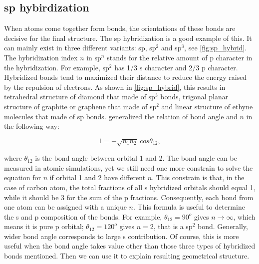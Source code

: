 \subsection{sp hybirdization}

When atoms come together form bonds, the orientations of these bonds are decisive for the final structure. The sp hybridization is a good example of this.  It can mainly exist in three different variants: sp, sp$^2$ and sp$^3$, see \autoref{fig:sp_hybrid}. The hybridization index $n$ in sp$^n$ stands for the relative amount of p character in the hybridization. For example, sp$^2$ has 1/3 s character and 2/3 p character. Hybridized bonds  tend to maximized their distance to reduce the energy raised by the repulsion of electrons. As shown in \autoref{fig:sp_hybrid}, this results in tetrahedral structure of diamond that made of sp$^3$ bonds, trigonal planar structure of graphite or graphene that made of sp$^2$ and linear structure of ethyne molecules that made of sp bonds.  \citet{coulson1949} generalized the relation of bond angle and $n$ in the following way:

\begin{equation}
1=-\sqrt{n_1n_2}~cos\theta_{12}, 
\end{equation}

where $\theta_{12}$ is the bond angle between orbital 1 and 2. The bond angle can be measured in atomic simulations, yet we still need one more constrain to solve the equation for $n$ if orbital 1 and 2 have different $n$. This constrain is that, in the case of carbon atom, the total fractions of all s hybridized orbitals should equal 1, while it should be 3 for the sum of the p fractions. Consequently, each bond from one atom can be assigned with a unique $n$. This formula is useful to determine the s and p composition of the bonds. For example, $\theta_{12}=90^o$ gives $n\rightarrow\infty$, which means it is pure p orbital; $\theta_{12}=120^o$ gives $n=2$, that is a sp$^2$ bond. Generally, wider bond angle corresponds to large s contribution. Of course, this is more useful when the bond angle takes value other than those three types of hybridized bonds mentioned. Then we can use it to explain resulting geometrical structure.

